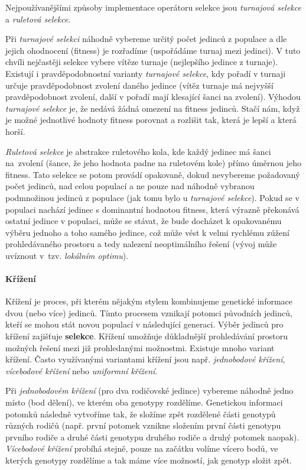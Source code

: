 Nejpoužívanějšími způsoby implementace operátoru selekce jsou \emph{turnajová
selekce} a \emph{ruletová selekce}. 

Při \emph{turnajové selekci} náhodně vybereme určitý počet jedinců z
populace a dle jejich ohodnocení (fitness) je rozřadíme (uspořádáme turnaj mezi
jedinci). V tuto chvíli nejčastěji selekce vybere vítěze turnaje (nejlepšího
jedince z turnaje). Existují i pravděpodobnostní varianty \emph{turnajové
selekce}, kdy pořadí v turnaji určuje pravděpodobnost zvolení daného jedince
(vítěz turnaje má nejvyšší pravděpodobnost zvolení, další v pořadí mají
klesající šanci na zvolení). Výhodou \emph{turnajové selekce} je, že nedává
žádná omezení na fitness jedinců. Stačí nám, když je možné jednotlivé hodnoty
fitness porovnat a rozlišit tak, která je lepší a která horší.

\emph{Ruletová selekce} je abstrakce ruletového kola, kde každý jedinec má šanci
na~zvolení (šance, že jeho hodnota padne na ruletovém kole) přímo úměrnou jeho
fitness. Tato selekce se potom provádí opakovaně, dokud nevybereme požadovaný
počet jedinců, nad celou populací a ne pouze nad náhodně vybranou podmnožinou
jedinců z populace (jak tomu bylo u \emph{turnajové selekce}). Pokud se v
populaci nachází jedinec s dominantní hodnotou fitness, která výrazně překonává
ostatní jedince v populaci, může se stávat, že bude docházet k opakovanému
výběru jednoho a toho samého jedince, což může vést k velmi rychlému zúžení
prohledávaného prostoru a tedy nalezení neoptimálního řešení (vývoj může
uvíznout v~tzv. \emph{lokálním optimu}).

\paragraph{Křížení}
Křížení je proces, při kterém nějakým stylem kombinujeme genetické informace
dvou (nebo více) jedinců. Tímto procesem vznikají potomci původních jedinců,
kteří se mohou stát novou populací v následující generaci. Výběr jedinců pro
křížení zajišťuje \textbf{selekce}. Křížení umožňuje důkladnější prohledávání
prostoru možných řešení mezi již prohledanými možnostmi. Existuje mnoho variant
křížení. Často využívanými variantami křížení jsou např. \emph{jednobodové
křížení}, \emph{vícebodové křížení} nebo \emph{uniformní křížení}.

Při \emph{jednobodovém křížení} (pro dva rodičovské jedince) vybereme náhodně
jedno místo (bod dělení), ve kterém oba genotypy rozdělíme. Genetickou
informaci potomků následně vytvoříme tak, že složíme zpět rozdělené části
genotypů různých rodičů (např. první potomek vznikne složením první části
genotypu prvního rodiče a druhé části genotypu druhého rodiče a druhý potomek
naopak). \emph{Vícebodové křížení} probíhá stejně, pouze na začátku volíme
vícero bodů, ve kterých genotypy rozdělíme a tak máme více možností, jak
genotyp složit zpět.

